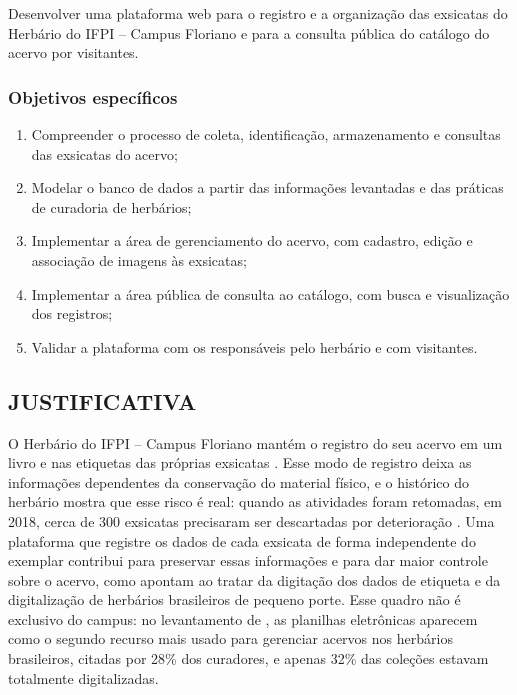 \documentclass[
    12pt,        %
    openany,     %
    oneside,     %
    a4paper,     %
    english,     %
    french,      %
    spanish,     %
    brazil,      %
    article      %
]{abntex2}
\begin{document}
Desenvolver uma plataforma web para o registro e a organização das exsicatas do Herbário do IFPI -- Campus Floriano e para a consulta pública do catálogo do acervo por visitantes.

\subsubsection{Objetivos específicos}
\label{subsubsec:objetivos-especificos}

\begin{enumerate}
    \item Compreender o processo de coleta, identificação, armazenamento e consultas das exsicatas do acervo; 
    \item Modelar o banco de dados a partir das informações levantadas e das práticas de curadoria de herbários;
    \item Implementar a área de gerenciamento do acervo, com cadastro, edição e associação de imagens às exsicatas;
    \item Implementar a área pública de consulta ao catálogo, com busca e visualização dos registros;
    \item Validar a plataforma com os responsáveis pelo herbário e com visitantes.
\end{enumerate}


\subsection{JUSTIFICATIVA}
\label{subsec:justificativa}

O Herbário do IFPI -- Campus Floriano mantém o registro do seu acervo em um livro e nas etiquetas das próprias exsicatas \cite{lopes2023herbario}. Esse modo de registro deixa as informações dependentes da conservação do material físico, e o histórico do herbário mostra que esse risco é real: quando as atividades foram retomadas, em 2018, cerca de 300 exsicatas precisaram ser descartadas por deterioração \cite{lopes2023herbario}. Uma plataforma que registre os dados de cada exsicata de forma independente do exemplar contribui para preservar essas informações e para dar maior controle sobre o acervo, como apontam  ao tratar da digitação dos dados de etiqueta e da digitalização de herbários brasileiros de pequeno porte. Esse quadro não é exclusivo do campus: no levantamento de , as planilhas eletrônicas aparecem como o segundo recurso mais usado para gerenciar acervos nos herbários brasileiros, citadas por 28\% dos curadores, e apenas 32\% das coleções estavam totalmente digitalizadas.
\end{document}

